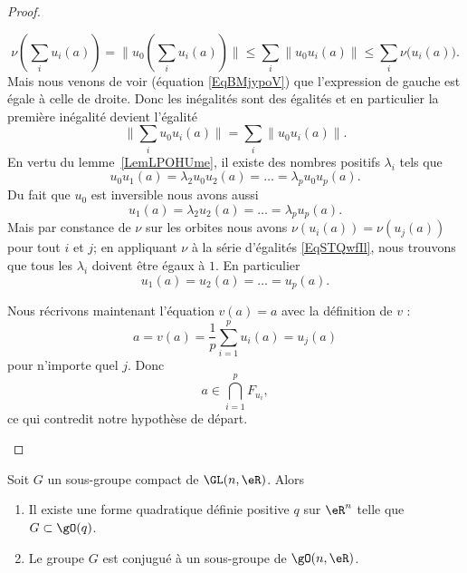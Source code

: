 \begin{proof}
\begin{subproof}
\begin{equation}
			\nu\left( \sum_i u_i(a) \right)=\| u_0\left( \sum_iu_i(a) \right) \|\leq\sum_i\| u_0u_i(a) \|\leq \sum_i\nu\big( u_i(a) \big).
		\end{equation}
		Mais nous venons de voir (équation \eqref{EqBMjypoV}) que l'expression de gauche est égale à celle de droite. Donc les inégalités sont des égalités et en particulier la première inégalité devient l'égalité
		\begin{equation}
			\| \sum_iu_0u_i(a)  \|=\sum_i\| u_0u_i(a) \|.
		\end{equation}
		En vertu du lemme~\ref{LemLPOHUme}, il existe des nombres positifs \( \lambda_i\) tels que
		\begin{equation}
			u_0u_1(a)=\lambda_2u_0u_2(a)=\ldots =\lambda_pu_0u_p(a).
		\end{equation}
		Du fait que \( u_0\) est inversible nous avons aussi
		\begin{equation}       \label{EqSTQwfIl}
			u_1(a)=\lambda_2u_2(a)=\ldots =\lambda_pu_p(a).
		\end{equation}
		Mais par constance de \( \nu\) sur les orbites nous avons \( \nu(u_i(a))=\nu(u_j(a))\) pour tout \( i\) et \( j\); en appliquant \( \nu\) à la série d'égalités \eqref{EqSTQwfIl}, nous trouvons que tous les \( \lambda_i\) doivent être égaux à \( 1\). En particulier
		\begin{equation}
			u_1(a)=u_2(a)=\ldots =u_p(a).
		\end{equation}

		Nous récrivons maintenant l'équation \( v(a)=a\) avec la définition de \( v\) :
		\begin{equation}
			a=v(a)=\frac{1}{ p }\sum_{i=1}^pu_i(a)=u_j(a)
		\end{equation}
		pour n'importe quel \( j\). Donc
		\begin{equation}
			a\in\bigcap_{i=1}^pF_{u_i},
		\end{equation}
		ce qui contredit notre hypothèse de départ.
	\end{subproof}
\end{proof}

\begin{proposition}     \label{PropQZkeHeG}
	Soit \( G\) un sous-groupe compact de \( \GL(n,\eR)\). Alors
	\begin{enumerate}
		\item
		      Il existe une forme quadratique définie positive \( q\) sur \( \eR^n\) telle que \( G\subset \gO(q)\).
		\item
		      Le groupe \( G\) est conjugué à un sous-groupe de \( \gO(n,\eR)\).
	\end{enumerate}
\end{proposition}

